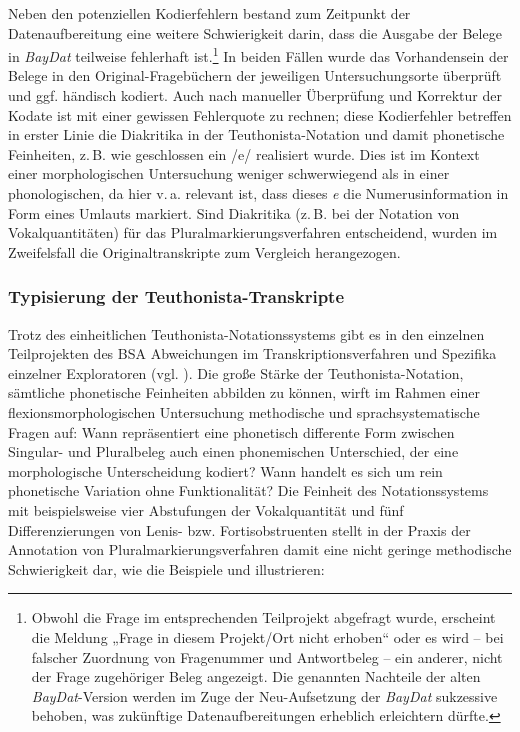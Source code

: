 Neben den potenziellen Kodierfehlern bestand zum Zeitpunkt der Datenaufbereitung eine weitere Schwierigkeit darin, dass die Ausgabe der Belege in \textit{BayDat} teilweise fehlerhaft ist.\footnote{Obwohl die Frage im entsprechenden Teilprojekt abgefragt wurde, erscheint die Meldung „Frage in diesem Projekt/Ort nicht erhoben“ oder es wird -- bei falscher Zuordnung von Fragenummer und Antwortbeleg -- ein anderer, nicht der Frage zugehöriger Beleg angezeigt. Die genannten Nachteile der alten \textit{BayDat}{}-Version werden im Zuge der Neu-Aufsetzung der \textit{BayDat} sukzessive behoben, was zukünftige Datenaufbereitungen erheblich erleichtern dürfte.} In beiden Fällen wurde das Vorhandensein der Belege in den Original-Fragebüchern der jeweiligen Untersuchungsorte überprüft und ggf. händisch kodiert. Auch nach manueller Überprüfung und Korrektur der Kodate ist mit einer gewissen Fehlerquote zu rechnen; diese Kodierfehler betreffen in erster Linie die Diakritika in der Teuthonista-Notation und damit phonetische Feinheiten, z.\,B. wie geschlossen ein /e/ realisiert wurde. Dies ist im Kontext einer morphologischen Untersuchung weniger schwerwiegend als in einer phonologischen, da hier v.\,a. relevant ist, dass dieses \textit{e} die Numerusinformation in Form eines Umlauts markiert. Sind Diakritika (z.\,B. bei der Notation von Vokalquantitäten) für das Pluralmarkierungsverfahren entscheidend, wurden im Zweifelsfall die Originaltranskripte zum Vergleich herangezogen.

\subsubsection{Typisierung der Teuthonista-Transkripte}
\label{sec:6.3.1.2}
Trotz des einheitlichen Teuthonista-Notationssystems gibt es in den einzelnen Teilprojekten des BSA Abweichungen im Transkriptionsverfahren und Spezifika einzelner Exploratoren (vgl. \citealt[22]{SNiB1}). Die große Stärke der Teuthonista-Notation, sämtliche phonetische Feinheiten abbilden zu können, wirft im Rahmen einer flexionsmorphologischen Untersuchung methodische und sprach\-sys\-tematische Fragen auf: Wann repräsentiert eine phonetisch differente Form zwischen Singular- und Pluralbeleg auch einen phonemischen Unterschied, der eine morphologische Unterscheidung kodiert? Wann handelt es sich um rein phonetische Variation ohne Funktionalität? Die Feinheit des Notationssystems mit beispielsweise vier Abstufungen der Vokalquantität und fünf Differenzierungen von Lenis- bzw. Fortisobstruenten stellt in der Praxis der Annotation von Pluralmarkierungsverfahren damit eine nicht geringe methodische Schwierigkeit dar, wie die Beispiele  und  illustrieren:

